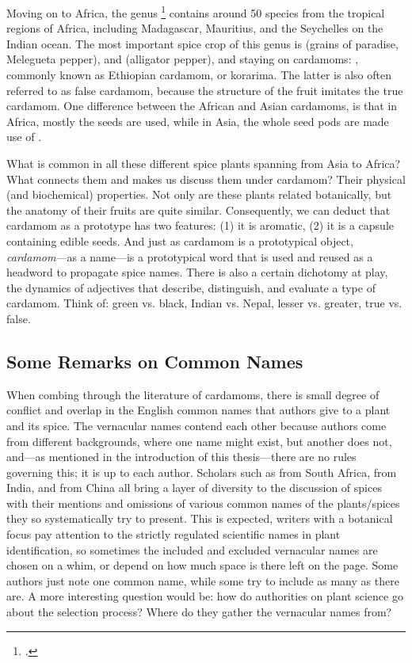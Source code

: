 Moving on to Africa, the genus \footcite[Aframomum K.Schum. ]{gbif} contains around 50 species from the tropical regions of Africa, including Madagascar, Mauritius, and the Seychelles on the Indian ocean. The most important spice crop of this genus is  (grains of paradise, Melegueta pepper), and  (alligator pepper), and staying on cardamoms: , commonly known as Ethiopian cardamom, or korarima. The latter is also often referred to as false cardamom, because the structure of the fruit imitates the true cardamom. One difference between the African and Asian cardamoms, is that in Africa, mostly the seeds are used, while in Asia, the whole seed pods are made use of \autocite{van_wyk_culinary_2014}.



What is common in all these different spice plants spanning from Asia to Africa? What connects them and makes us discuss them under cardamom? Their physical (and biochemical) properties. Not only are these plants related botanically, but the anatomy of their fruits are quite similar. Consequently, we can deduct that cardamom as a prototype has two features: (1) it is aromatic, (2) it is a capsule containing edible seeds. And just as cardamom is a prototypical object, \textit{cardamom}---as a name---is a prototypical word that is used and reused as a headword to propagate spice names. There is also a certain dichotomy at play, the dynamics of adjectives that describe, distinguish, and evaluate a type of cardamom. Think of: green vs. black, Indian vs. Nepal, lesser vs. greater, true vs. false.

\subsection{Some Remarks on Common Names}

When combing through the literature of cardamoms, there is small degree of conflict and overlap in the English common names that authors give to a plant and its spice. The vernacular names contend each other because authors come from different backgrounds, where one name might exist, but another does not, and---as mentioned in the introduction of this thesis---there are no rules governing this; it is up to each author. Scholars such as \citeauthor{van_wyk_culinary_2014} from South Africa, \citeauthor{ravindran_cardamom_2002} from India, and \citeauthor{hu_food_2005} from China all bring a layer of diversity to the discussion of spices with their mentions and omissions of various common names of the plants/spices they so systematically try to present. This is expected, writers with a botanical focus pay attention to the strictly regulated scientific names in plant identification, so sometimes the included and excluded vernacular names are chosen on a whim, or depend on how much space is there left on the page. Some authors just note one common name, while some try to include as many as there are. A more interesting question would be: how do authorities on plant science go about the selection process? Where do they gather the vernacular names from?


